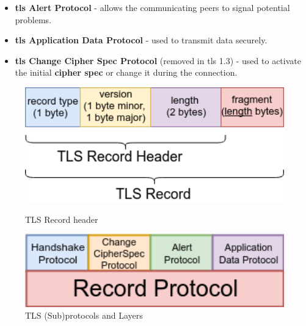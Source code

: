 \documentclass{llncs}
\begin{document}
{\begin{itemize}
   protocol has been removed. The concept of \textbf{cipher suite} has been updated
   to define the pair consisting of an \gls{aead} algorithm and a hash function to be used with
   \gls{hkdf}. In \gls{tls} $1.3$ the \textbf{key exchange} algorithm is negotiated via
   extensions.
  \item \textbf{\gls{tls} Alert Protocol} - allows the communicating peers to
  signal potential problems.
  \item \textbf{\gls{tls} Application Data Protocol} - used to transmit data securely.
  \item \textbf{\gls{tls} Change Cipher Spec Protocol} (removed in \gls{tls} 1.3) -
  used to activate the initial \textbf{cipher spec} or change it during the connection.
\end{itemize}

\begin{figure}
    \centering
    \begin{minipage}{0.5\textwidth}
        \centering
        \includegraphics[width=1.0\textwidth]{img/record-header-3.png} %
        \caption{\label{fig:tls-record-header} TLS Record header}
    \end{minipage}\hfill
    \begin{minipage}{0.47\textwidth}
        \centering
        \includegraphics[width=1.0\textwidth]{img/tls-sub-protocols-3.png} %
        \caption{\label{fig:tls-subprotocols} TLS (Sub)protocols and Layers}
    \end{minipage}
\end{figure}


}
\end{document}
